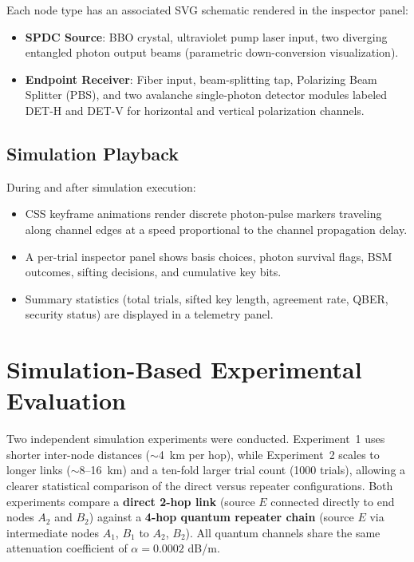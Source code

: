 \documentclass[12pt,oneside,letterpaper,english]{article}
\begin{document}
Each node type has an associated SVG schematic rendered in the inspector panel:
\begin{itemize}
    \item \textbf{SPDC Source}: BBO crystal, ultraviolet pump laser input, two diverging entangled photon output beams (parametric down-conversion visualization).
    \item \textbf{Endpoint Receiver}: Fiber input, beam-splitting tap, Polarizing Beam Splitter (PBS), and two avalanche single-photon detector modules labeled DET-H and DET-V for horizontal and vertical polarization channels.
\end{itemize}

\subsection{Simulation Playback}

During and after simulation execution:
\begin{itemize}
    \item CSS keyframe animations render discrete photon-pulse markers traveling along channel edges at a speed proportional to the channel propagation delay.
    \item A per-trial inspector panel shows basis choices, photon survival flags, BSM outcomes, sifting decisions, and cumulative key bits.
    \item Summary statistics (total trials, sifted key length, agreement rate, QBER, security status) are displayed in a telemetry panel.
\end{itemize}

\section{Simulation-Based Experimental Evaluation}

Two independent simulation experiments were conducted. Experiment~1 uses shorter
inter-node distances ($\sim$4~km per hop), while Experiment~2 scales to longer
links ($\sim$8--16~km) and a ten-fold larger trial count (1000 trials), allowing
a clearer statistical comparison of the direct versus repeater configurations.
Both experiments compare a \textbf{direct 2-hop link} (source $E$ connected
directly to end nodes $A_2$ and $B_2$) against a \textbf{4-hop quantum repeater
chain} (source $E$ via intermediate nodes $A_1$, $B_1$ to $A_2$, $B_2$).
All quantum channels share the same attenuation coefficient of
$\alpha = 0.0002$ dB/m.
\end{document}
